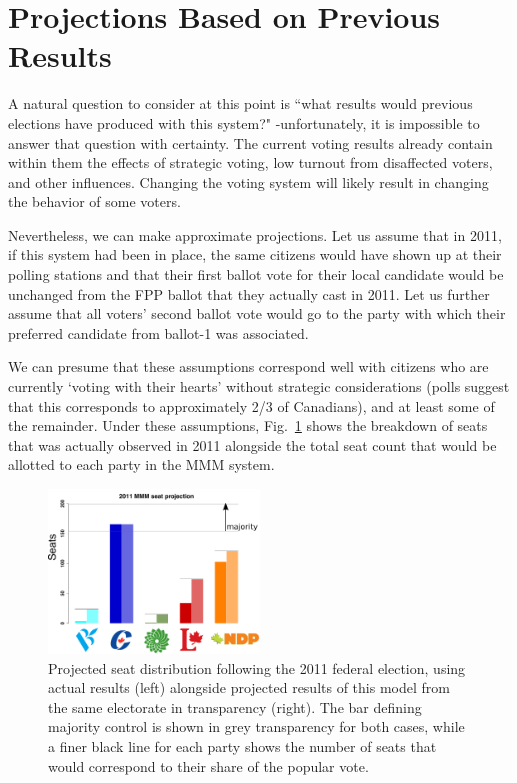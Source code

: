 \documentclass[DIV=calc, paper=a4, fontsize=11pt, twocolumn]{scrartcl}	 %
\begin{document}
\section{Projections Based on Previous Results}

A natural question to consider at this point is ``what results would previous elections have produced with this system?" \--unfortunately, it is impossible to answer that question with certainty. 
The current voting results already contain within them the effects of strategic voting, low turnout from disaffected voters, and other influences. Changing the voting system will likely result in changing the behavior of some voters.

Nevertheless, we can make approximate projections. Let us assume that in 2011, if this system had been in place, the same citizens would have shown up at their polling stations and that their first ballot vote for their local candidate would be unchanged from the FPP ballot that they actually cast in 2011. 
Let us further assume that all voters' second ballot vote would go to the party with which their preferred candidate from ballot-1 was associated. 

We can presume that these assumptions correspond well with citizens who are currently `voting with their hearts' without strategic considerations (polls suggest that this corresponds to approximately 2/3 of Canadians), and at least some of the remainder. Under these assumptions, Fig.~\ref{fig:hypo_2011} shows the breakdown of seats that was actually observed in 2011 alongside the total seat count that would be allotted to each party in the MMM system.
\begin{figure}[h!]
  \includegraphics[width=0.50\textwidth,clip]{Figs/2011_seat_projection}
  \caption{ Projected seat distribution following the 2011 federal election, using actual results (left) alongside projected results of this model from the same electorate in transparency (right). The bar defining majority control is shown in grey transparency for both cases, while a finer black line for each party shows the number of seats that would correspond to their share of the popular vote.
}
\label{fig:hypo_2011}
\end{figure}
\end{document}
